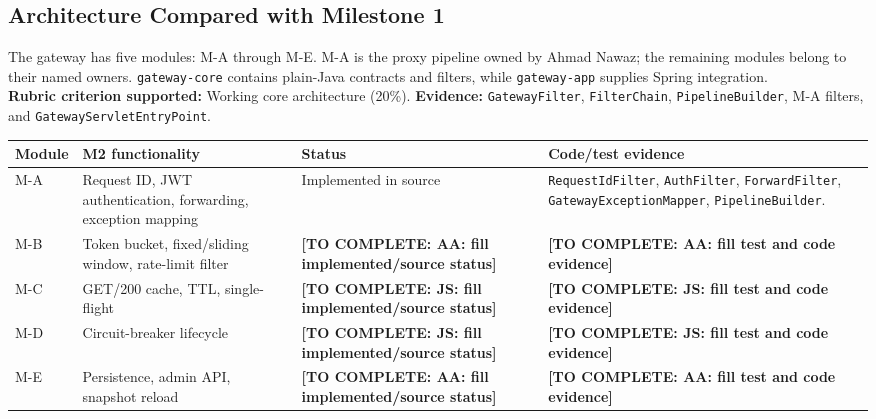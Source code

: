 \documentclass[12pt,a4paper]{article}
\newcommand{\cls}[1]{\nolinkurl{#1}}
\newcommand{\ma}{Ahmad Nawaz}
\newcommand{\todo}[1]{\textcolor{red!70!black}{\textbf{[TO COMPLETE: #1]}}}
\begin{document}
\subsection{Architecture Compared with Milestone 1}
The gateway has five modules: M-A through M-E. M-A is the proxy pipeline owned by \ma; the remaining modules belong to their named owners. \texttt{gateway-core} contains plain-Java contracts and filters, while \texttt{gateway-app} supplies Spring integration.\\
\textbf{Rubric criterion supported:} Working core architecture (20\%). \textbf{Evidence:} \cls{GatewayFilter}, \cls{FilterChain}, \cls{PipelineBuilder}, M-A filters, and \cls{GatewayServletEntryPoint}.
\begin{longtable}{L{1.2cm} L{3.8cm} L{2.2cm} L{5.0cm}}\toprule
\textbf{Module} & \textbf{M2 functionality} & \textbf{Status} & \textbf{Code/test evidence}\\\midrule\endhead
M-A & Request ID, JWT authentication, forwarding, exception mapping & Implemented in source & \cls{RequestIdFilter}, \cls{AuthFilter}, \cls{ForwardFilter}, \cls{GatewayExceptionMapper}, \cls{PipelineBuilder}.\\
M-B & Token bucket, fixed/sliding window, rate-limit filter & \todo{AA: fill implemented/source status} & \todo{AA: fill test and code evidence}\\
M-C & GET/200 cache, TTL, single-flight & \todo{JS: fill implemented/source status} & \todo{JS: fill test and code evidence}\\
M-D & Circuit-breaker lifecycle & \todo{JS: fill implemented/source status} & \todo{JS: fill test and code evidence}\\
M-E & Persistence, admin API, snapshot reload & \todo{AA: fill implemented/source status} & \todo{AA: fill test and code evidence}\\\bottomrule\end{longtable}
\end{document}
